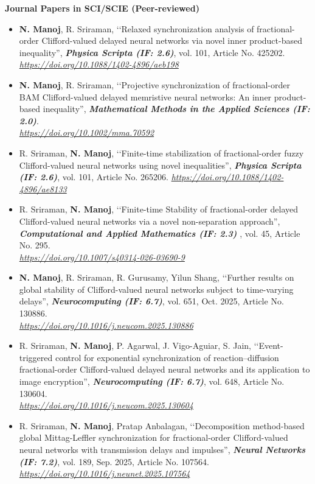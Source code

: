 \documentclass[A4,11pt]{article}
\begin{document}
 \textbf{Journal Papers in SCI/SCIE (Peer-reviewed)}
\begin{itemize}
	\item[2026] {\bf N. Manoj}, R. Sriraman, \lq\lq Relaxed synchronization analysis of fractional-order Clifford-valued delayed neural networks via novel inner product-based inequality'', \textbf{\textit{Physica Scripta (IF: 2.6)}}, vol. 101, Article No. 425202.
	\textit{\url{https://doi.org/10.1088/1402-4896/aeb198}}
	\item[2026] {\bf N. Manoj}, R. Sriraman, \lq\lq Projective synchronization of fractional-order BAM Clifford-valued delayed memristive neural networks: An inner product-based inequality'', \textbf{\textit{Mathematical Methods in the Applied Sciences (IF: 2.0)}}.\\ \textit{\url{https://doi.org/10.1002/mma.70592}}
	\item[2026] R. Sriraman, {\bf N. Manoj}, \lq\lq Finite-time stabilization of fractional-order fuzzy Clifford-valued neural networks using novel inequalities'', \textbf{\textit{Physica Scripta (IF: 2.6)}}, vol. 101, Article No. 265206.
	\textit{\url{https://doi.org/10.1088/1402-4896/ae8133}}
	\item[2026] R. Sriraman, {\bf N. Manoj}, \lq\lq Finite-time Stability of fractional-order delayed Clifford-valued neural networks via a novel non-separation approach'', \textbf{\textit{Computational and Applied Mathematics (IF: 2.3)}} , vol. 45, Article No. 295.\\ \textit{\url{https://doi.org/10.1007/s40314-026-03690-9}}
	\item[2025] {\bf N. Manoj}, R. Sriraman, R. Gurusamy, Yilun Shang, \lq\lq Further results on global stability of Clifford-valued neural networks subject to time-varying delays'', \textbf{\textit{Neurocomputing (IF: 6.7)}}, vol. 651, Oct. 2025, Article No. 130886.\\ \textit{\url{https://doi.org/10.1016/j.neucom.2025.130886}}
	\item[2025] R. Sriraman, {\bf N. Manoj}, P. Agarwal, J. Vigo-Aguiar, S. Jain, \lq\lq Event-triggered control for exponential synchronization of reaction–diffusion fractional-order Clifford-valued delayed neural networks and its application to image encryption'', \textbf{\textit{Neurocomputing (IF: 6.7)}}, vol. 648, Article No. 130604.\\ \textit{\url{https://doi.org/10.1016/j.neucom.2025.130604}}
	\item[2025] R. Sriraman, {\bf N. Manoj}, Pratap Anbalagan, \lq\lq Decomposition method-based global Mittag-Leffler synchronization for fractional-order Clifford-valued neural networks with transmission delays and impulses'', \textbf{\textit{Neural Networks (IF: 7.2)}}, vol. 189, Sep. 2025, Article No. 107564.\\ \textit{\url{https://doi.org/10.1016/j.neunet.2025.107564}}

\end{itemize}
\end{document}
